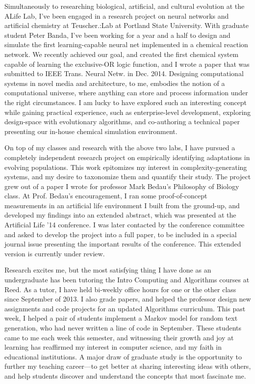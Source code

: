 \documentclass{article}
\begin{document}
Simultaneously to researching biological, artificial, and cultural evolution at the ALife Lab, I've been engaged in a research project on neural networks and artificial chemistry at Teuscher.:Lab at Portland State University. With graduate student Peter Banda, I've been working for a year and a half to design and simulate the first learning-capable neural net implemented in a chemical reaction network. We recently achieved our goal, and created the first chemical system capable of learning the exclusive-OR logic function, and I wrote a paper that was submitted to IEEE Trans. Neural Netw. in Dec. 2014. Designing computational systems in novel media and architecture, to me, embodies the notion of a computational universe, where anything can store and process information under the right circumstances. I am lucky to have explored such an interesting concept while gaining practical experience, such as enterprise-level development, exploring design-space with evolutionary algorithms, and co-authoring a technical paper presenting our in-house chemical simulation environment.


On top of my classes and research with the above two labs, I have pursued a completely independent research project on empirically identifying adaptations in evolving populations. This work epitomizes my interest in complexity-generating systems, and my desire to taxonomize them and quantify their study. The project grew out of a paper I wrote for professor Mark Bedau's Philosophy of Biology class. At Prof. Bedau's encouragement, I ran some proof-of-concept measurements in an artificial life environment I built from the ground-up, and developed my findings into an extended abstract, which was presented at the Artificial Life '14 conference. I was later contacted by the conference committee and asked to develop the project into a full paper, to be included in a special journal issue presenting the important results of the conference. This extended version is currently under review.

Research excites me, but the most satisfying thing I have done as an undergraduate has been tutoring the Intro Computing and Algorithms courses at Reed. As a tutor, I have held bi-weekly office hours for one or the other class since September of 2013. I also grade papers, and helped the professor design new assignments and code projects for an updated Algorithms curriculum. This past week, I helped a pair of students implement a Markov model for random text generation, who had never written a line of code in September. These students came to me each week this semester, and witnessing their growth and joy at learning has reaffirmed my interest in computer science, and my faith in educational institutions. A major draw of graduate study is the opportunity to further my teaching career---to get better at sharing interesting ideas with others, and help students discover and understand the concepts that most fascinate me.
\end{document}
